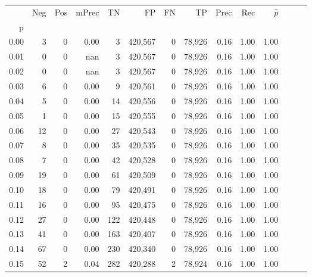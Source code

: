 \begin{tabular}{rrrrrrrrrrrrrr}
\toprule
{} &     Neg &    Pos & mPrec &       TN &       FP &      FN &      TP &  Prec &   Rec & $\hat{p}$ \\
p    &         &        &       &          &          &         &         &       &       &           \\
\midrule
0.00 &       3 &      0 &  0.00 &        3 &  420,567 &       0 &  78,926 &  0.16 &  1.00 &      1.00 \\
0.01 &       0 &      0 &   nan &        3 &  420,567 &       0 &  78,926 &  0.16 &  1.00 &      1.00 \\
0.02 &       0 &      0 &   nan &        3 &  420,567 &       0 &  78,926 &  0.16 &  1.00 &      1.00 \\
0.03 &       6 &      0 &  0.00 &        9 &  420,561 &       0 &  78,926 &  0.16 &  1.00 &      1.00 \\
0.04 &       5 &      0 &  0.00 &       14 &  420,556 &       0 &  78,926 &  0.16 &  1.00 &      1.00 \\
0.05 &       1 &      0 &  0.00 &       15 &  420,555 &       0 &  78,926 &  0.16 &  1.00 &      1.00 \\
0.06 &      12 &      0 &  0.00 &       27 &  420,543 &       0 &  78,926 &  0.16 &  1.00 &      1.00 \\
0.07 &       8 &      0 &  0.00 &       35 &  420,535 &       0 &  78,926 &  0.16 &  1.00 &      1.00 \\
0.08 &       7 &      0 &  0.00 &       42 &  420,528 &       0 &  78,926 &  0.16 &  1.00 &      1.00 \\
0.09 &      19 &      0 &  0.00 &       61 &  420,509 &       0 &  78,926 &  0.16 &  1.00 &      1.00 \\
0.10 &      18 &      0 &  0.00 &       79 &  420,491 &       0 &  78,926 &  0.16 &  1.00 &      1.00 \\
0.11 &      16 &      0 &  0.00 &       95 &  420,475 &       0 &  78,926 &  0.16 &  1.00 &      1.00 \\
0.12 &      27 &      0 &  0.00 &      122 &  420,448 &       0 &  78,926 &  0.16 &  1.00 &      1.00 \\
0.13 &      41 &      0 &  0.00 &      163 &  420,407 &       0 &  78,926 &  0.16 &  1.00 &      1.00 \\
0.14 &      67 &      0 &  0.00 &      230 &  420,340 &       0 &  78,926 &  0.16 &  1.00 &      1.00 \\
0.15 &      52 &      2 &  0.04 &      282 &  420,288 &       2 &  78,924 &  0.16 &  1.00 &      1.00 \\

\end{tabular}
